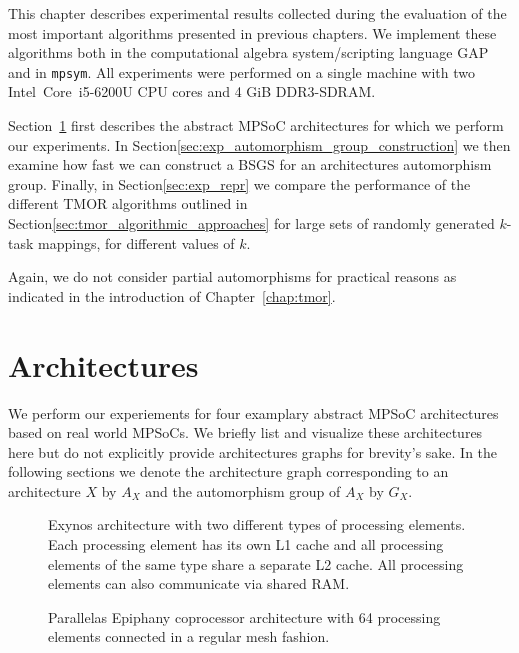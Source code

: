 This chapter describes experimental results collected during the evaluation of
the most important algorithms presented in previous chapters.  We implement
these algorithms both in the computational algebra system/scripting language
GAP~\cite{GAP4} and in \texttt{mpsym}. All experiments were performed on a
single machine with two Intel\textregistered\ Core\texttrademark\ i5-6200U CPU
cores and 4 GiB DDR3-SDRAM.

Section~\ref{sec:exp_mpsoc_architectures} first describes the abstract MPSoC
architectures for which we perform our experiments. In
Section\ref{sec:exp_automorphism_group_construction} we then examine how fast
we can construct a BSGS for an architectures automorphism group. Finally, in
Section\ref{sec:exp_repr} we compare the performance of the different TMOR
algorithms outlined in Section\ref{sec:tmor_algorithmic_approaches} for large
sets of randomly generated $k$-task mappings, for different values of $k$.

Again, we do not consider partial automorphisms for practical reasons as
indicated in the introduction of Chapter~\ref{chap:tmor}.

\section{Architectures}
\label{sec:exp_mpsoc_architectures}

We perform our experiements for four examplary abstract MPSoC architectures
based on real world MPSoCs. We briefly list and visualize these architectures
here but do not explicitly provide architectures graphs for brevity's sake.  In
the following sections we denote the architecture graph corresponding to an
architecture $X$ by $A_X$ and the automorphism group of $A_X$ by $G_X$.

\begin{figure}
  \centering
  \caption{Exynos architecture with two different types of processing elements.
           Each processing element has its own L1 cache and all processing
           elements of the same type share a separate L2 cache. All processing
           elements can also communicate via shared RAM.}
  \label{fig:exynos}
\end{figure}

\begin{figure}
  \centering
  \caption{Parallelas Epiphany coprocessor architecture with 64 processing
           elements connected in a regular mesh fashion.}
  \label{fig:parallella}
\end{figure}

